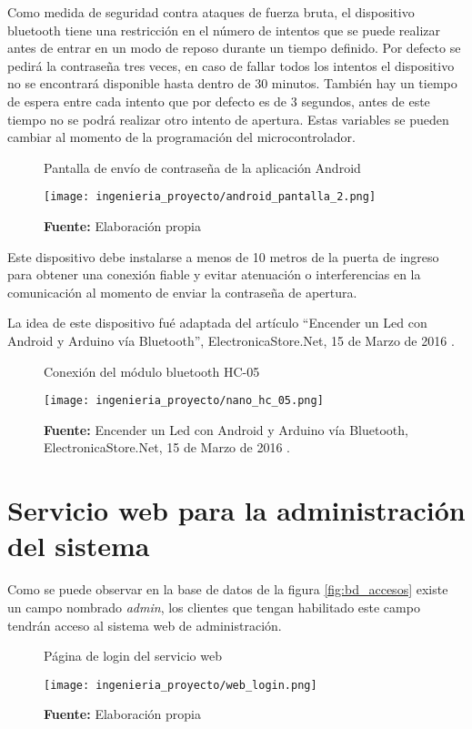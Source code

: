 \documentclass[../principal]{subfiles}
\begin{document}
  Como medida de seguridad contra ataques de fuerza bruta, el dispositivo bluetooth tiene una restricción en el número de intentos que se puede realizar antes de entrar en un modo de reposo durante un tiempo definido. Por defecto se pedirá la contraseña tres veces, en caso de fallar todos los intentos el dispositivo no se encontrará disponible hasta dentro de 30 minutos. También hay un tiempo de espera entre cada intento que por defecto es de 3 segundos, antes de este tiempo no se podrá realizar otro intento de apertura. Estas variables se pueden cambiar al momento de la programación del microcontrolador.

  \begin{figure}[H]
    \centering
    \caption{Pantalla de envío de contraseña de la aplicación Android}
    \texttt{[image: ingenieria\_proyecto/android\_pantalla\_2.png]}
    \caption*{\textbf{Fuente:} Elaboración propia}
    \label{fig:android_pantalla_2}
  \end{figure}

  Este dispositivo debe instalarse a menos de 10 metros de la puerta de ingreso para obtener una conexión fiable y evitar atenuación o interferencias en la comunicación al momento de enviar la contraseña de apertura.

  La idea de este dispositivo fué adaptada del artículo ``Encender un Led con Android y Arduino vía Bluetooth'', ElectronicaStore.Net, 15 de Marzo de 2016 \cite{web:nano_hc_05}.

  \begin{figure}[H]
    \centering
    \caption{Conexión del módulo bluetooth HC-05}
    \texttt{[image: ingenieria\_proyecto/nano\_hc\_05.png]}
    \caption*{\textbf{Fuente:} Encender un Led con Android y Arduino vía Bluetooth, ElectronicaStore.Net, 15 de Marzo de 2016 \cite{web:nano_hc_05}.}
  \end{figure}

  \section{Servicio web para la administración del sistema}

  Como se puede observar en la base de datos de la figura \ref{fig:bd_accesos} existe un campo nombrado \textit{admin}, los clientes que tengan habilitado este campo tendrán acceso al sistema web de administración.

  \begin{figure}[H]
    \centering
    \caption{Página de login del servicio web}
    \texttt{[image: ingenieria\_proyecto/web\_login.png]}
    \caption*{\textbf{Fuente:} Elaboración propia}
    \label{fig:web_login}
  \end{figure}
\end{document}

